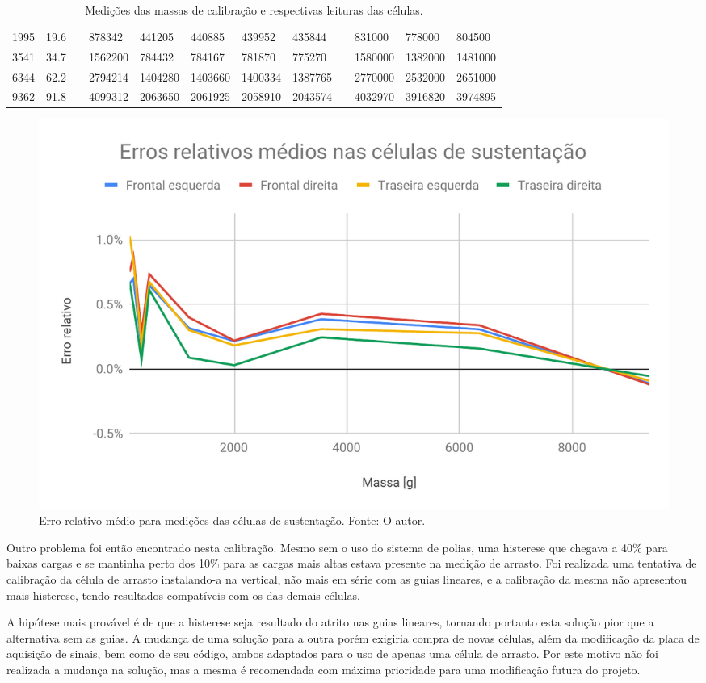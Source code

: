 \begin{table}[]
{\begin{tabular}{llllllllllll}
1995 & 19.6 &  & 878342 & 441205 & 440885 & 439952 & 435844 &  & 831000 & 778000 & 804500 \\
3541 & 34.7 &  & 1562200 & 784432 & 784167 & 781870 & 775270 &  & 1580000 & 1382000 & 1481000 \\
6344 & 62.2 &  & 2794214 & 1404280 & 1403660 & 1400334 & 1387765 &  & 2770000 & 2532000 & 2651000 \\
9362 & 91.8 &  & 4099312 & 2063650 & 2061925 & 2058910 & 2043574 &  & 4032970 & 3916820 & 3974895
\end{tabular}}
\caption{Medições das massas de calibração e respectivas leituras das células.}
\label{tab:calib_celulas}
\end{table}

\begin{figure}[!ht]
    \centering
    \includegraphics[width=.8\linewidth]{figuras/calibracao/plot_erro_sustentacao.pdf}
    \caption{Erro relativo médio para medições das células de sustentação. Fonte: O autor.}
    \label{fig:curva_erros_sustentacao}
\end{figure}

Outro problema foi então encontrado nesta calibração. Mesmo sem o uso do sistema de polias, uma histerese que chegava a 40\% para baixas cargas e se mantinha perto dos 10\% para as cargas mais altas estava presente na medição de arrasto. Foi realizada uma tentativa de calibração da célula de arrasto instalando-a na vertical, não mais em série com as guias lineares, e a calibração da mesma não apresentou mais histerese, tendo resultados compatíveis com os das demais células.

A hipótese mais provável é de que a histerese seja resultado do atrito nas guias lineares, tornando portanto esta solução pior que a alternativa sem as guias. A mudança de uma solução para a outra porém exigiria compra de novas células, além da modificação da placa de aquisição de sinais, bem como de seu código, ambos adaptados para o uso de apenas uma célula de arrasto. Por este motivo não foi realizada a mudança na solução, mas a mesma é recomendada com máxima prioridade para uma modificação futura do projeto.

